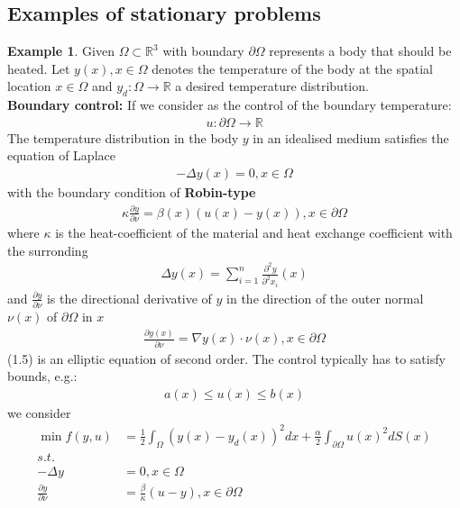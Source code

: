 \documentclass[a4paper,11pt,fleqn]{book}
\theoremstyle{definition}
\newtheorem*{example}{Example}
\theoremstyle{remark}
\begin{document}
\subsection{Examples of stationary problems}
\begin{example}
	Given $\Omega \subset \mathbb{R}^3$ with boundary $\partial \Omega$ represents a body that should be heated. Let $y(x), x \in \Omega$ denotes the temperature of the body at the spatial location $x \in \Omega$ and $y_d: \Omega \rightarrow \mathbb{R}$ a desired temperature distribution. \\
	\textbf{Boundary control:}
	If we consider as the control of the boundary temperature:
	\begin{align*}
		u: \partial \Omega \rightarrow \mathbb{R}
	\end{align*}
	The temperature distribution in the body $y$ in an idealised medium satisfies the equation of Laplace
	\begin{align}
		- \Delta y(x) = 0, x \in \Omega
	\end{align}
	with the boundary condition of \textbf{Robin-type}
	\begin{align*}
		\kappa \frac{\partial y}{\partial \nu} = \beta(x) (u(x) - y(x)), x \in \partial \Omega
	\end{align*}
	where $\kappa$ is the heat-coefficient of the material and heat exchange coefficient with the surronding 
	\begin{align*}
		\Delta y(x) = \sum_{i = 1}^n \frac{\partial^2 y}{\partial^2 x_i}(x)
	\end{align*}
	and $\frac{\partial y}{\partial \nu}$ 
	is the directional derivative of $y$ in the direction of the outer normal $\nu(x)$ of $\partial \Omega$ in $x$ 
	\begin{align*}
		\frac{\partial y(x)}{\partial \nu} = \nabla y(x) \cdot \nu(x), x \in \partial \Omega
	\end{align*}
	(1.5) is an elliptic equation of second order. The control typically has to satisfy bounds, e.g.:
\begin{align*}
	a(x) \le u(x) \le b(x)
\end{align*}
we consider
\begin{align*}
	\min f(y, u) &= \frac{1}{2}\int_\Omega (y(x) - y_d(x))^2 dx + \frac{\alpha}{2} \int_{\partial \Omega} u(x)^2 dS(x)\\
	s.t.\\
	 - \Delta y &= 0, x \in \Omega\\
	\frac{\partial y}{\partial \nu} &= \frac{\beta}{\kappa}(u - y), x \in \partial \Omega\\

\end{align*}
\end{example}
\end{document}
